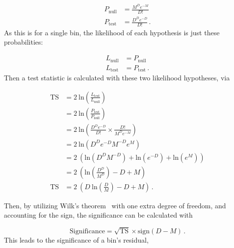 \begin{equation}\label{eqn:sig_hypo}
  \begin{split}
    P_{\textrm{null}} & = \frac{M^{D} e^{-M}}{D!} \\
    P_{\textrm{test}} & = \frac{D^{D} e^{-D}}{D!} \,.
  \end{split}
\end{equation}
As this is for a single bin, the likelihood of each hypothesis is just these probabilities:
  
\begin{equation}
  \begin{split}
    L_{\textrm{null}} & = P_{\textrm{null}} \\
    L_{\textrm{test}} & = P_{\textrm{test}} \,.
  \end{split}
\end{equation}
Then a test statistic is calculated with these two likelihood hypotheses, via

\begin{equation}
  \begin{split}
    \textrm{TS} & = 2 \: \textrm{ln} \left ( \frac{ L_{\textrm{test}} }{ L_{\textrm{null}}    } \right ) \\
                & = 2 \: \textrm{ln} \left ( \frac{ P_{\textrm{test}} }{ P_{\textrm{null}}    } \right ) \\
                & = 2 \: \textrm{ln} \left ( \frac{D^D e^{-D}}{D!} \times \frac{D!}{M^D e^{-M}} \right ) \\
                & = 2 \: \textrm{ln} \left ( D^D e^{-D} M^{-D} e^M                              \right ) \\
                & = 2 \: \left (      \textrm{ln} \left ( D^D M^{-D} \right ) + \textrm{ln} \left ( e^{-D} \right ) + \textrm{ln} \left ( e^M  \right )\right ) \\
                & = 2 \: \left (      \textrm{ln} \left (  \frac{D^D}{M^D} \right ) -D + M \right ) \\
    \textrm{TS} & = 2 \: \left ( D \: \textrm{ln} \left (  \frac{D  }{M  } \right ) -D + M \right ) \,.
  \end{split}
\end{equation}
  
Then, by utilizing Wilk's theorem~\cite{wilks1938} with one extra degree of freedom, and accounting for the sign, the significance can be calculated with
  
\begin{equation}
  \textrm{Significance} = \sqrt{\textrm{TS}} \times \textrm{sign} \left ( D - M \right ) \,.
\end{equation}
This leads to the significance of a bin's residual,

